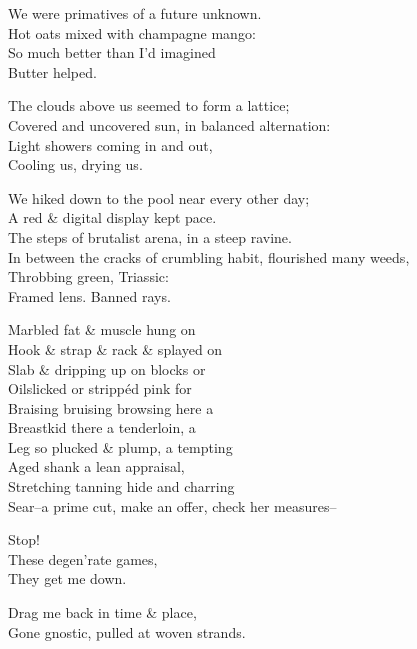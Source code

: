 
We were primatives of a future unknown. \\
Hot oats mixed with champagne mango: \\
So much better than I'd imagined \\
Butter helped.

The clouds above us seemed to form a lattice; \\
Covered and uncovered sun, in balanced alternation: \\
Light showers coming in and out, \\
Cooling us, drying us.

We hiked down to the pool near every other day; \\
A red \& digital display kept pace. \\
The steps of brutalist arena, in a steep ravine. \\

In between the cracks of crumbling habit, flourished many weeds, \\
Throbbing green, Triassic: \\
Framed lens. Banned rays.

Marbled fat \& muscle hung on \\
Hook \& strap \& rack \& splayed on \\
Slab \& dripping up on blocks or \\
Oilslicked or strippéd pink for \\
Braising bruising browsing here a \\
Breastkid there a tenderloin, a \\
Leg so plucked \& plump, a tempting \\
Aged shank a lean appraisal, \\
Stretching tanning hide and charring \\
Sear--a prime cut, make an offer, check her measures--

Stop! \\
These degen'rate games, \\
They get me down.

Drag me back in time \& place, \\
Gone gnostic, pulled at woven strands.
